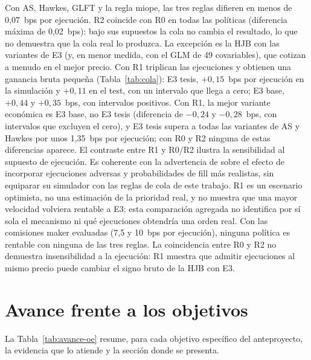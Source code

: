 Con AS, Hawkes, GLFT y la regla miope, las tres reglas difieren en menos de 0,07~bps por ejecución. R2 coincide con R0 en todas las políticas (diferencia máxima de 0,02~bps): bajo sus supuestos la cola no cambia el resultado, lo que no demuestra que la cola real lo produzca. La excepción es la HJB con las variantes de E3 (y, en menor medida, con el GLM de 49 covariables), que cotizan a menudo en el mejor precio. Con R1 triplican las ejecuciones y obtienen una ganancia bruta pequeña (Tabla~\ref{tab:cola}): E3 tesis, $+0{,}15$~bps por ejecución en la simulación y $+0{,}11$ en el test, con un intervalo que llega a cero; E3 base, $+0{,}44$ y $+0{,}35$~bps, con intervalos positivos. Con R1, la mejor variante económica es E3 base, no E3 tesis (diferencia de $-0{,}24$ y $-0{,}28$~bps, con intervalos que excluyen el cero), y E3 tesis supera a todas las variantes de AS y Hawkes por unos 1,35~bps por ejecución; con R0 y R2 ninguna de estas diferencias aparece. El contraste entre R1 y R0/R2 ilustra la sensibilidad al supuesto de ejecución. Es coherente con la advertencia de \citet{LalorSwishchuk2024} sobre el efecto de incorporar ejecuciones adversas y probabilidades de fill más realistas, sin equiparar su simulador con las reglas de cola de este trabajo. R1 es un escenario optimista, no una estimación de la prioridad real, y no muestra que una mayor velocidad volviera rentable a E3; esta comparación agregada no identifica por sí sola el mecanismo ni qué ejecuciones obtendría una orden real. Con las comisiones maker evaluadas (7,5 y 10~bps por ejecución), ninguna política es rentable con ninguna de las tres reglas. La coincidencia entre R0 y R2 no demuestra insensibilidad a la ejecución: R1 muestra que admitir ejecuciones al mismo precio puede cambiar el signo bruto de la HJB con E3.

\Needspace{.72\textheight}  %
\section{Avance frente a los objetivos}

La Tabla~\ref{tab:avance-oe} resume, para cada objetivo específico del anteproyecto, la evidencia que lo atiende y la sección donde se presenta.

